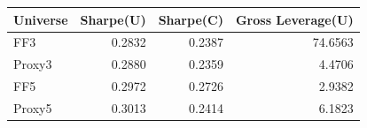 \begin{tabular}{lrrr}
\toprule
Universe & Sharpe(U) & Sharpe(C) & Gross Leverage(U) \\
\midrule
FF3 & 0.2832 & 0.2387 & 74.6563 \\
Proxy3 & 0.2880 & 0.2359 & 4.4706 \\
FF5 & 0.2972 & 0.2726 & 2.9382 \\
Proxy5 & 0.3013 & 0.2414 & 6.1823 \\
\bottomrule
\end{tabular}
